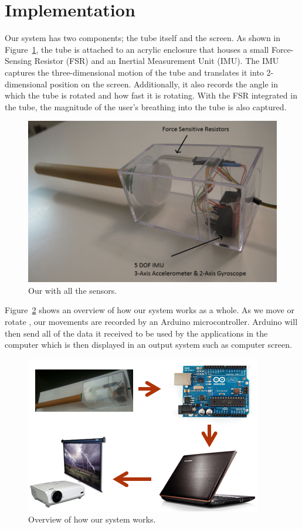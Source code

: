 \section{Implementation}\label{sec:impl}

Our \tube system has two components; the tube itself and the screen. As shown in Figure~\ref{fig:impl1}, the tube is attached to an acrylic enclosure that houses a small Force-Sensing Resistor (FSR) and an Inertial Measurement Unit (IMU). The IMU captures the three-dimensional motion of the tube and translates it into 2-dimensional position on the screen. Additionally, it also records the angle in which the tube is rotated and how fast it is rotating. With the FSR integrated in the tube, the magnitude of the user’s breathing into the tube is also captured. 

\begin{figure}
  \centering
  \includegraphics[width=\linewidth]{./figs/impl1.png}
  \caption{Our \tube with all the sensors.}
  \label{fig:impl1}
\end{figure}

Figure~\ref{fig:design-sketch} shows an overview of how our \tube system works as a whole. As we move or rotate \tube, our movements are recorded by an Arduino microcontroller. Arduino will then send all of the data it received to be used by the applications in the computer which is then displayed in an output system such as computer screen.

\begin{figure}
  \centering
  \includegraphics[width=0.8\linewidth]{./figs/sketch.png}
  \caption{Overview of how our system works.}
  \label{fig:design-sketch}
\end{figure}

